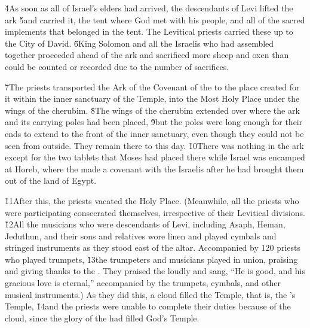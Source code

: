 \v{4}As soon as all of Israel's elders had arrived, the descendants of Levi lifted the ark \v{5}and carried it, the tent where God met with his people, and all of the sacred implements that belonged in the tent. The Levitical priests carried these up to the City of David. \v{6}King Solomon and all the Israelis who had assembled together proceeded ahead of the ark and sacrificed more sheep and oxen than could be counted or recorded due to the number of sacrifices.

\v{7}The priests transported the Ark of the Covenant of the  to the place created for it within the inner sanctuary of the Temple, into the Most Holy Place under the wings of the cherubim. \v{8}The wings of the cherubim extended over where the ark and its carrying poles had been placed, \v{9}but the poles were long enough for their ends to extend to the front of the inner sanctuary, even though they could not be seen from outside. They remain there to this day. \v{10}There was nothing in the ark except for the two tablets that Moses had placed there while Israel was encamped at Horeb, where the  made a covenant with the Israelis after he had brought them out of the land of Egypt.

\v{11}After this, the priests vacated the Holy Place. (Meanwhile, all the priests who were participating consecrated themselves, irrespective of their Levitical divisions. \v{12}All the musicians who were descendants of Levi, including Asaph, Heman, Jeduthun, and their sons and relatives wore linen and played cymbals and stringed instruments as they stood east of the altar. Accompanied by 120 priests who played trumpets, \v{13}the trumpeters and musicians played in union, praising and giving thanks to the . They praised the  loudly and sang, ``He is good, and his gracious love is eternal,'' accompanied by the trumpets, cymbals, and other musical instruments.) As they did this, a cloud filled the Temple, that is, the 's Temple, \v{14}and the priests were unable to complete their duties because of the cloud, since the glory of the  had filled God's Temple.

